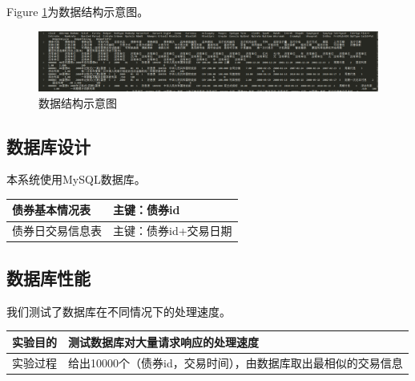 Figure \ref{fig:sys.param}为数据结构示意图。
\begin{figure}[H]
\begin{center}
\includegraphics[width=16cm]{img//DataStructure.PNG}
\caption{数据结构示意图}
\label{fig:sys.param}
\end{center}
\end{figure}



\subsection{数据库设计}
本系统使用MySQL数据库。
\begin{table}[H]
\begin{adjustwidth}{-3cm}{-3cm}
\begin{center}
\begin{tabular}{|p{}| p{}|} \hline
债券基本情况表 & 主键：债券id  \\ \hline
债券日交易信息表 & 主键：债券id+交易日期\\ \hline
\end{tabular}
\end{center}
\end{adjustwidth}
\end{table}


\subsection{数据库性能}
我们测试了数据库在不同情况下的处理速度。
\begin{table}[H]
\begin{adjustwidth}{-3cm}{-3cm}
\begin{center}
\begin{tabular}{|p{}| p{}|} \hline
实验目的 & 测试数据库对大量请求响应的处理速度  \\ \hline
实验过程 &给出10000个（债券id，交易时间），由数据库取出最相似的交易信息\\ \hline
\end{tabular}
\end{center}
\end{adjustwidth}
\end{table}


